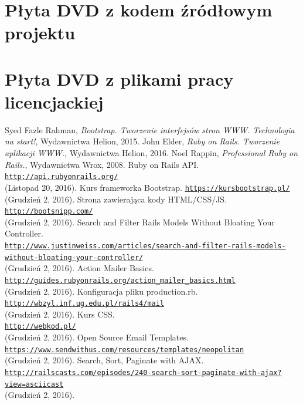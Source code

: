 \documentclass[openright]{xmgr}
\begin{document}
	\appendix
	\chapter{Płyta DVD z kodem źródłowym projektu}	
	
	\chapter{Płyta DVD z plikami pracy licencjackiej}
	
	\begin{thebibliography}{11}
		 Syed Fazle Rahman, \emph{Bootstrap. Tworzenie interfejsów stron WWW. Technologia na start!}, Wydawnictwa Helion, 2015.
		 John Elder, \emph{Ruby on Rails. Tworzenie aplikacji WWW.}, Wydawnictwa Helion, 2016.
		 Noel Rappin, \emph{Professional Ruby on Rails.}, Wydawnictwa Wrox, 2008.
		Ruby on Rails API. \texttt{\url{http://api.rubyonrails.org/}} \\(Listopad 20, 2016).
		Kurs frameworka Bootstrap. \texttt{\url{https://kursbootstrap.pl/}} \\(Grudzień 2, 2016).
		Strona zawierająca kody HTML/CSS/JS. \texttt{\url{http://bootsnipp.com/}} \\(Grudzień 2, 2016).
		Search and Filter Rails Models Without Bloating Your Controller. \\\texttt{\url{http://www.justinweiss.com/articles/search-and-filter-rails-models-without-bloating-your-controller/}} \\(Grudzień 2, 2016).
		Action Mailer Basics. \\\texttt{\url{http://guides.rubyonrails.org/action_mailer_basics.html}} \\(Grudzień 2, 2016).
		Konfiguracja pliku production.rb. \\\texttt{\url{http://wbzyl.inf.ug.edu.pl/rails4/mail}} \\(Grudzień 2, 2016).
		Kurs CSS. \\\texttt{\url{http://webkod.pl/}} \\(Grudzień 2, 2016).
		Open Source Email Templates. \\\texttt{\url{https://www.sendwithus.com/resources/templates/neopolitan}} \\(Grudzień 2, 2016).
		Search, Sort, Paginate with AJAX. \\\texttt{\url{http://railscasts.com/episodes/240-search-sort-paginate-with-ajax?view=asciicast}} \\(Grudzień 2, 2016).
	\end{thebibliography}
	
	\listoffigures
	
	\lstlistoflistings
	
	\listoftables
	
	\oswiadczenie
	
\end{document}
